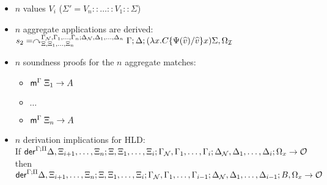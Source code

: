    \begin{itemize}[leftmargin=\secondm]
      \item $n$ values $V_i$ ($\Sigma' = V_n :: \dots :: V_1 :: \Sigma$)
      \item $n$ aggregate applications are derived:\\
      $s_2 = \curvearrowright_{\Xi, \Xi_1, \dotsc, \Xi_n}^{\Gamma_{\mathcal{N}},
      \Gamma_1, \dotsc, \Gamma_n; \Delta_{\mathcal{N}}, \Delta_1, \dotsc,
         \Delta_n} \Gamma; \Delta; (\lambda x.  C\{\Psi(\widehat{v})/\widehat{v}\} x) \Sigma,
            \Omega_{\mathcal{I}}$
      \item $n$ soundness proofs for the $n$ aggregate matches:
      \begin{itemize}[leftmargin=\thirdm]
         \item $\mathsf{m}^{\Gamma} \; \Xi_1 \rightarrow A$
         \item $\dots$
         \item $\mathsf{m}^{\Gamma} \; \Xi_n \rightarrow A$
      \end{itemize}

      \item $n$ derivation implications for HLD: \\
      If $\mathsf{der}^{\Gamma ; \Pi} \Delta, \Xi_{i+1}, \dotsc, \Xi_{n} ; \Xi, \Xi_1,
         \dotsc, \Xi_i; \Gamma_{\mathcal{N}}, \Gamma_1, \dotsc, \Gamma_i; \Delta_{\mathcal{N}},
            \Delta_1, \dotsc, \Delta_i; \Omega_x \rightarrow \mathcal{O}$ then\\
            \hspace{5cm} $\mathsf{der}^{\Gamma ; \Pi} \Delta, \Xi_{i+1}, \dotsc, \Xi_{n} ; \Xi, \Xi_1,
            \dotsc, \Xi_i; \Gamma_{\mathcal{N}}, \Gamma_1, \dotsc, \Gamma_{i-1}; \Delta_{\mathcal{N}},
            \Delta_1, \dotsc, \Delta_{i-1}; B, \Omega_x \rightarrow \mathcal{O}$
   \end{itemize}

